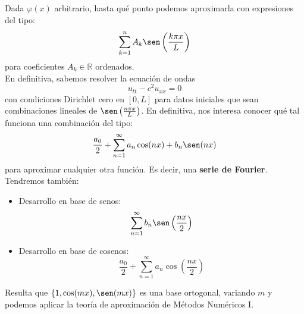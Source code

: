 \noindent
Dada $\varphi(x)$ arbitrario, hasta qué punto podemos aproximarla con expresiones del tipo:
\begin{equation*}
    \sum_{k=1}^{n}A_k\sen\left(\frac{k\pi x}{L}\right)
\end{equation*}
para coeficientes $A_k\in \mathbb{R}$ ordenados.\\

\noindent
En definitiva, sabemos resolver la ecuación de ondas
\begin{equation*}
    u_{tt} - c^2 u_{xx} = 0
\end{equation*}
con condiciones Dirichlet cero en $[0,L]$ para datos iniciales que sean combinaciones lineales de $\sen\left(\frac{n\pi x}{L}\right)$. En definitiva, nos interesa conocer qué tal funciona una combinación del tipo: 
\begin{equation*}
    \frac{a_0}{2} + \sum_{n=1}^\infty a_n\cos(nx) + b_n\sen(nx)
\end{equation*}
para aproximar cualquier otra función. Es decir, una \textbf{serie de Fourier}. Tendremos también:
\begin{itemize}
    \item Desarrollo en base de senos:
        \begin{equation*}
            \sum_{n=1}^\infty b_n \sen\left(\frac{nx}{2}\right)
        \end{equation*}
    \item Desarrollo en base de cosenos:
        \begin{equation*}
            \frac{a_0}{2} + \sum_{n=1}^\infty a_n \cos\left(\frac{nx}{2}\right)
        \end{equation*}
\end{itemize}
Resulta que $\{1, \cos(mx), \sen(mx)\}$ es una base ortogonal, variando $m$ y podemos aplicar la teoría de aproximación de Métodos Numéricos I.\\

